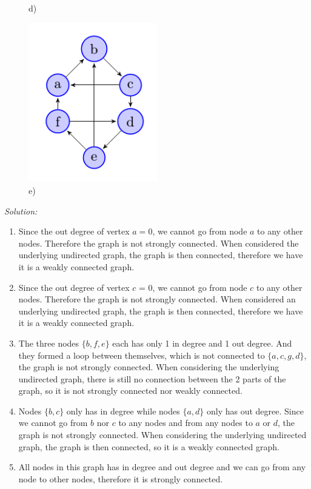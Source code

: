 \documentclass[a4paper]{article}
\begin{document}
\begin{figure}[H]
\begin{minipage}{0.3\textwidth}
			\caption*{d)}
		\end{minipage}
		\begin{minipage}{0.3\textwidth}
			\centering
			\includegraphics[width=0.5\textwidth]{tut91_5.png}
			\caption*{e)}
		\end{minipage}
	\end{figure}
	\textit{Solution:}
	\begin{enumerate}[label = \alph*)]
		\item 
		      Since the out degree of vertex $a = 0$, we cannot go from node $a$ to any other nodes. Therefore the graph is not strongly connected. When considered the underlying undirected graph, the graph is then connected, therefore we have it is a weakly connected graph.
		\item 
		      Since the out degree of vertex $c$ = 0, we cannot go from node $c$ to any other nodes. Therefore the graph is not strongly connected. When considered an underlying undirected graph, the graph is then connected, therefore we have it is a weakly connected graph.
		\item 
		      The three nodes $\{b,f,e\}$ each has only 1 in degree and 1 out degree. And they formed a loop between themselves, which is not connected to $\{a,c,g,d\}$, the graph is not strongly connected. When considering the underlying undirected graph, there is still no connection between the 2 parts of the graph, so it is not strongly connected nor weakly connected.
		\item 
		      Nodes $\{b,c\}$ only has in degree while nodes $\{a,d\}$ only has out degree. Since we cannot go from $b$ nor $c$ to any nodes and from any nodes to $a$ or $d$, the graph is not strongly connected. When considering the underlying undirected graph, the graph is then connected, so it is a weakly connected graph.
		\item 
		      All nodes in this graph has in degree and out degree and we can go from any node to other nodes, therefore it is strongly connected.
	\end{enumerate}
	
\end{document}
